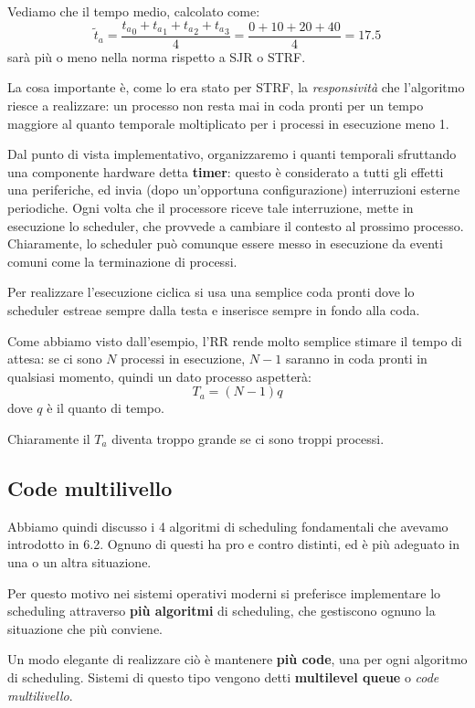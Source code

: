 \documentclass[a4paper,11pt]{article}
\begin{document}
Vediamo che il tempo medio, calcolato come:
$$
\tilde{t}_a = \frac{{t_a}_0 + {t_a}_1 + {t_a}_2 + {t_a}_3}{4} = \frac{0 + 10 + 20 + 40}{4} = 17.5
$$
sarà più o meno nella norma rispetto a SJR o STRF.

La cosa importante è, come lo era stato per STRF, la \textit{responsività} che l'algoritmo riesce a realizzare: un processo non resta mai in coda pronti per un tempo maggiore al quanto temporale moltiplicato per i processi in esecuzione meno 1.

\par\smallskip

Dal punto di vista implementativo, organizzaremo i quanti temporali sfruttando una componente hardware detta \textbf{timer}: questo è considerato a tutti gli effetti una periferiche, ed invia (dopo un'opportuna configurazione) interruzioni esterne periodiche.
Ogni volta che il processore riceve tale interruzione, mette in esecuzione lo scheduler, che provvede a cambiare il contesto al prossimo processo.
Chiaramente, lo scheduler può comunque essere messo in esecuzione da eventi comuni come la terminazione di processi.

Per realizzare l'esecuzione ciclica si usa una semplice coda pronti dove lo scheduler estreae sempre dalla testa e inserisce sempre in fondo alla coda.

Come abbiamo visto dall'esempio, l'RR rende molto semplice stimare il tempo di attesa: se ci sono $N$ processi in esecuzione, $N - 1$ saranno in coda pronti in qualsiasi momento, quindi un dato processo aspetterà:
$$
T_a = (N - 1)q
$$
dove $q$ è il quanto di tempo.

Chiaramente il $T_a$ diventa troppo grande se ci sono troppi processi.

\subsection{Code multilivello}
Abbiamo quindi discusso i 4 algoritmi di scheduling fondamentali che avevamo introdotto in 6.2.
Ognuno di questi ha pro e contro distinti, ed è più adeguato in una o un altra situazione.

Per questo motivo nei sistemi operativi moderni si preferisce implementare lo scheduling attraverso \textbf{più algoritmi} di scheduling, che gestiscono ognuno la situazione che più conviene.

Un modo elegante di realizzare ciò è mantenere \textbf{più code}, una per ogni algoritmo di scheduling. Sistemi di questo tipo vengono detti \textbf{multilevel queue} o \textit{code multilivello}.
\end{document}
